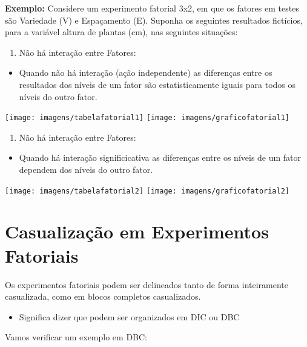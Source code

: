 \documentclass[
]{book}
\providecommand{\tightlist}{%
  \setlength{\itemsep}{0pt}\setlength{\parskip}{0pt}}
\begin{document}
\textbf{Exemplo:} Considere um experimento fatorial 3x2, em que os fatores em testes são Variedade (V) e Espaçamento (E). Suponha os seguintes resultados fictícios, para a variável altura de plantas (cm), nas seguintes situações:

\begin{enumerate}
\def\labelenumi{\arabic{enumi}.}
\tightlist
\item
  Não há interação entre Fatores:
\end{enumerate}

\begin{itemize}
\tightlist
\item
  Quando não há interação (ação independente) as diferenças entre os resultados dos níveis de um fator são estatisticamente iguais para todos os níveis do outro fator.
\end{itemize}

\texttt{[image: imagens/tabelafatorial1]}
\texttt{[image: imagens/graficofatorial1]}

\begin{enumerate}
\def\labelenumi{\arabic{enumi}.}
\setcounter{enumi}{1}
\tightlist
\item
  Não há interação entre Fatores:
\end{enumerate}

\begin{itemize}
\tightlist
\item
  Quando há interação significicativa as diferenças entre os níveis de um fator dependem dos níveis do outro fator.
\end{itemize}

\texttt{[image: imagens/tabelafatorial2]}
\texttt{[image: imagens/graficofatorial2]}

\section{Casualização em Experimentos Fatoriais}\label{casualizauxe7uxe3o-em-experimentos-fatoriais}

Os experimentos fatoriais podem ser delineados tanto de forma inteiramente casualizada, como em blocos completos casualizados.

\begin{itemize}
\tightlist
\item
  Significa dizer que podem ser organizados em DIC ou DBC
\end{itemize}

Vamos verificar um exemplo em DBC:
\end{document}
